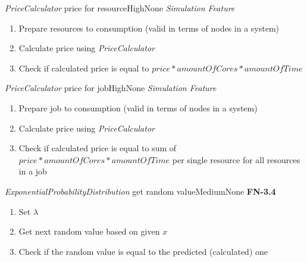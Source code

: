 \begin{testcase}{\emph{PriceCalculator} price for resource}{High}{None}
	{
		\emph{Simulation Feature}
	}
	{
		\begin{enumerate}
			\item Prepare resources to consumption (valid in terms of nodes in a system)
			\item Calculate price using \emph{PriceCalculator}
			\item Check if calculated price is equal to $price * amountOfCores * amountOfTime$
		\end{enumerate}
	}
\end{testcase}

\begin{testcase}{\emph{PriceCalculator} price for job}{High}{None}
	{
		\emph{Simulation Feature}
	}
	{
		\begin{enumerate}
			\item Prepare job to consumption (valid in terms of nodes in a system)
			\item Calculate price using \emph{PriceCalculator}
			\item Check if calculated price is equal to sum of $price * amountOfCores * amountOfTime$ per single resource for all resources in a job
		\end{enumerate}
	}
\end{testcase}


\begin{testcase}{\emph{ExponentialProbabilityDistribution} get random value}{Medium}{None}
	{
		\textbf{FN-3.4}
	}
	{
		\begin{enumerate}
			\item Set $\lambda$
			\item Get next random value based on given $x$
			\item Check if the random value is equal to the predicted (calculated) one
		\end{enumerate}
	}
\end{testcase}

